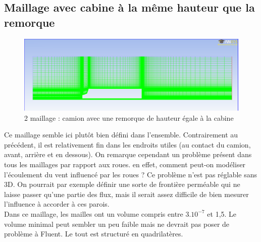 \subsection{Maillage avec cabine à la même hauteur que la remorque}
\begin{figure}[!h]
\centering
\includegraphics[scale=0.38]{images/remorque1_mesh.png}
\caption{2\ieme{} maillage : camion avec une remorque de hauteur égale à la cabine}
\end{figure}
Ce maillage semble ici plutôt bien défini dans l'ensemble. Contrairement au précédent, il est relativement fin dans les endroits utiles (au contact du camion, avant, arrière et en dessous). On remarque cependant un problème présent dans tous les maillages par rapport aux roues. en effet, comment peut-on modéliser l'écoulement du vent influencé par les roues ? Ce problème n'est pas réglable sans 3D. On pourrait par exemple définir une sorte de frontière perméable qui ne laisse passer qu'une partie des flux, mais il serait assez difficile de bien mesurer l'influence à accorder à ces parois.\\
Dans ce maillage, les mailles ont un volume compris entre $3.10^{-7}$ et 1,5. Le volume minimal peut sembler un peu faible mais ne devrait pas poser de problème à Fluent. Le tout est structuré en quadrilatères.

